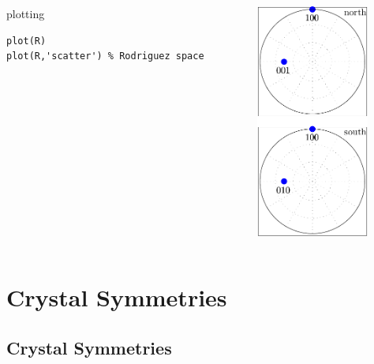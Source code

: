\documentclass[compress]{beamer}
\begin{document}
\begin{frame}[fragile]
\begin{columns}
\begin{column}{8cm}
\begin{overlayarea}{8cm}{8cm}
plotting
\begin{lstlisting}[style=input]
plot(R)
plot(R,'scatter') % Rodriguez space
\end{lstlisting}

\end{overlayarea}
\end{column}

\begin{column}{3.7cm}
  \includegraphics[width=3.7cm]{pic/rotation}
\end{column}

\end{columns}

\end{frame}

\section{Crystal Symmetries}
\label{sec:symmetries}

\subsection*{Crystal Symmetries}
\label{sec:crystal-symmetries}
\end{document}
